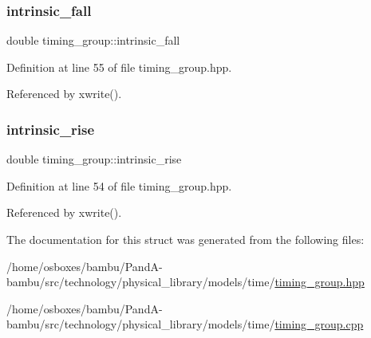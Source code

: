 \subsubsection{\texorpdfstring{intrinsic\+\_\+fall}{intrinsic\_fall}}
{\footnotesize\ttfamily double timing\+\_\+group\+::intrinsic\+\_\+fall}



Definition at line 55 of file timing\+\_\+group.\+hpp.



Referenced by xwrite().

\mbox{\label{structtiming__group_a3efb5b55c8fdd7b73096b3787d5c64be}} 
\subsubsection{\texorpdfstring{intrinsic\+\_\+rise}{intrinsic\_rise}}
{\footnotesize\ttfamily double timing\+\_\+group\+::intrinsic\+\_\+rise}



Definition at line 54 of file timing\+\_\+group.\+hpp.



Referenced by xwrite().



The documentation for this struct was generated from the following files\+:\begin{DoxyCompactItemize}
\item 
/home/osboxes/bambu/\+Pand\+A-\/bambu/src/technology/physical\+\_\+library/models/time/\hyperlink{timing__group_8hpp}{timing\+\_\+group.\+hpp}\item 
/home/osboxes/bambu/\+Pand\+A-\/bambu/src/technology/physical\+\_\+library/models/time/\hyperlink{timing__group_8cpp}{timing\+\_\+group.\+cpp}\end{DoxyCompactItemize}
